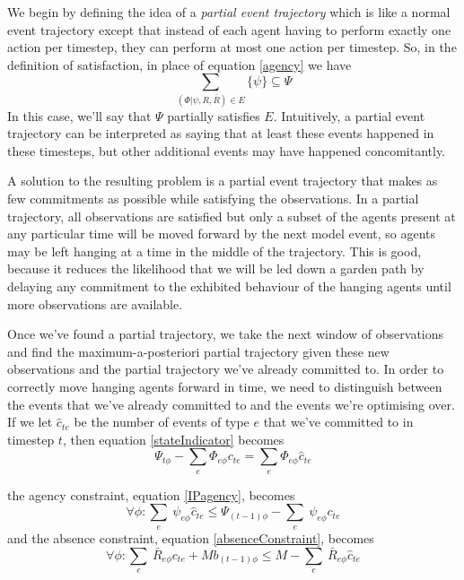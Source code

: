 \documentclass{article}
\begin{document}
We begin by defining the idea of a \textit{partial event trajectory} which is like a normal event trajectory except that instead of each agent having to perform exactly one action per timestep, they can perform at most one action per timestep. So, in the definition of satisfaction, in place of equation \ref{agency} we have
\begin{equation}
\sum_{(\Phi|\psi,R,\bar{R})\in E}\{\psi\} \subseteq \Psi
\end{equation}
In this case, we'll say that $\Psi$ partially satisfies $E$. Intuitively, a partial event trajectory can be interpreted as saying that at least these events happened in these timesteps, but other additional events may have happened concomitantly.

A solution to the resulting problem is a partial event trajectory that makes as few commitments as possible while satisfying the observations. In a partial trajectory, all observations are satisfied but only a subset of the agents present at any particular time will be moved forward by the next model event, so agents may be left hanging at a time in the middle of the trajectory. This is good, because it reduces the likelihood that we will be led down a garden path by delaying any commitment to the exhibited behaviour of the hanging agents until more observations are available.

Once we've found a partial trajectory, we take the next window of observations and find the maximum-a-posteriori partial trajectory given these new observations and the partial trajectory we've already committed to. In order to correctly move hanging agents forward in time, we need to distinguish between the events that we've already committed to and the events we're optimising over. If we let $\hat{c}_{te}$ be the number of events of type $e$ that we've committed to in timestep $t$, then equation \ref{stateIndicator} becomes
\begin{equation}
\Psi_{t\phi} -  \sum_e\Phi_{e\phi}c_{te} = \sum_e\Phi_{e\phi}\hat{c}_{te}
\label{stateIndicator}
\end{equation}


the agency constraint, equation \ref{IPagency}, becomes
\begin{equation}
\forall\phi:  \sum_e\ \psi_{e\phi}\hat{c}_{te} \le \Psi_{(t-1)\phi}  -  \sum_e\ \psi_{e\phi} c_{te}
\end{equation}
and the absence constraint, equation \ref{absenceConstraint}, becomes
\begin{equation}
\forall\phi: \sum_e\ \bar{R}_{e\phi} c_{te} + Mb_{(t-1)\phi} \le M - \sum_e\ \bar{R}_{e\phi} \hat{c}_{te}
\end{equation}
\end{document}
